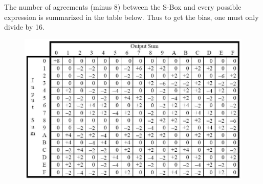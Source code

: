 \documentclass[9pt]{beamer}
\begin{document}
\begin{frame}
The number of agreements (minus 8) between the S-Box and every possible expression is summarized in the table below. Thus to get the bias, one must only divide by 16.

\vspace{5mm}
\begin{figure}
\includegraphics[height=0.7\textheight]{spn_linear_approx.jpg}
\end{figure}
\end{frame}
\end{document}
